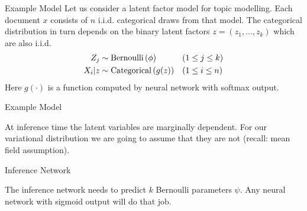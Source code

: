 \documentclass[14pt]{beamer}
\begin{document}

\begin{frame}{Example Model}
Let us consider a latent factor model for topic modelling. Each document $ x $ consists of $ n $ i.i.d.
categorical draws from that model. The categorical distribution in turn depends on the binary latent 
factors $ z = (z_{1},\ldots,z_{k}) $ which are also i.i.d.
\begin{equation*}
\begin{aligned}
Z_{j} &\sim \operatorname{Bernoulli}\left(\phi\right) && (1 \leq j \leq k) \\ 
X_{i}|z &\sim \operatorname{Categorical}\left(g(z)\right) && (1 \leq i \leq n)
\end{aligned}
\end{equation*} 
Here $ g(\cdot) $ is a function computed by neural network with softmax output.
\end{frame}

\begin{frame}{Example Model}
\begin{figure}
\center
{}
\end{figure}
At inference time the latent variables are marginally dependent. For our variational distribution
we are going to assume that they are not (recall: mean field assumption).
\end{frame}

\begin{frame}{Inference Network}
\begin{figure}
\center
{}
\end{figure}
The inference network needs to predict $ k $ Bernoulli parameters $ \psi $. Any neural network with
sigmoid output will do that job.
\end{frame}
\end{document}
